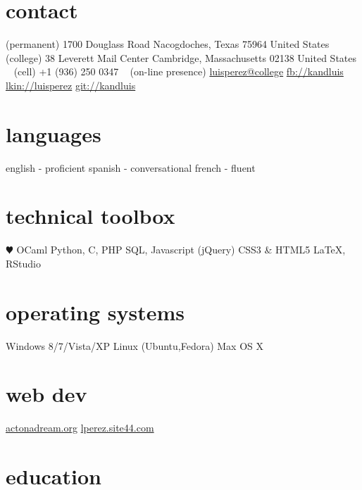 \documentclass[]{friggeri-cv} %
\begin{document}


\begin{aside} %
\section{contact}
(permanent)
1700 Douglass Road
Nacogdoches, Texas 75964
United States
~
(college)
38 Leverett Mail Center
Cambridge, Massachusetts 02138
United States
~
(cell)
+1 (936) 250 0347
~
(on-line presence)
\href{mailto:luisperez@college.harvard.edu}{luisperez@college}
\href{http://facebook.com/kandluis}{fb://kandluis}
\href{http://www.linkedin.com/pub/luis-perez/73/793/770}{lkin://luisperez}
\href{http://www.github.com/kandluis}{git://kandluis}
\section{languages}
english - proficient
spanish - conversational
french - fluent
\section{technical toolbox}
{\color{red} $\varheartsuit$} OCaml
Python, C, PHP
SQL, Javascript (jQuery)
CSS3 \& HTML5
\LaTeX, RStudio
\section{operating systems}
Windows 8/7/Vista/XP
Linux (Ubuntu,Fedora)
Max OS X
\section{web dev}
\href{http://www.actonadream.org/}{actonadream.org}
\href{http://www.lperez.site44.com}{lperez.site44.com}
\end{aside}


\section{education}
\end{document}
